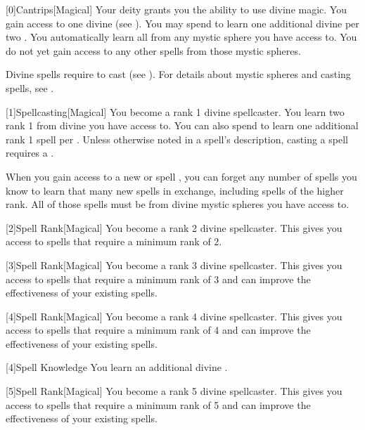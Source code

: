         [0]{Cantrips}[Magical]
        Your deity grants you the ability to use divine magic.
        You gain access to one divine  (see ).
        You may spend  to learn one additional divine  per two .
        You automatically learn all  from any mystic sphere you have access to.
        You do not yet gain access to any other spells from those mystic spheres.

        Divine spells require  to cast (see ).
        For details about mystic spheres and casting spells, see .

        [1]{Spellcasting}[Magical]
        You become a rank 1 divine spellcaster.
        You learn two rank 1  from divine  you have access to.
        You can also spend  to learn one additional rank 1 spell per .
        Unless otherwise noted in a spell's description, casting a spell requires a .

        When you gain access to a new  or spell ,
            you can forget any number of spells you know to learn that many new spells in exchange,
            including spells of the higher rank.
        All of those spells must be from divine mystic spheres you have access to.

        [2]{Spell Rank}[Magical] You become a rank 2 divine spellcaster.
        This gives you access to spells that require a minimum rank of 2.

        [3]{Spell Rank}[Magical] You become a rank 3 divine spellcaster.
        This gives you access to spells that require a minimum rank of 3 and can improve the effectiveness of your existing spells.

        [4]{Spell Rank}[Magical] You become a rank 4 divine spellcaster.
        This gives you access to spells that require a minimum rank of 4 and can improve the effectiveness of your existing spells.

        [4]{Spell Knowledge} You learn an additional divine .

        [5]{Spell Rank}[Magical] You become a rank 5 divine spellcaster.
        This gives you access to spells that require a minimum rank of 5 and can improve the effectiveness of your existing spells.


